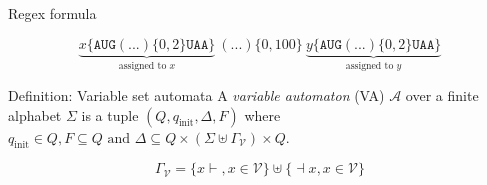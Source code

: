 \documentclass{beamer}
\begin{document}
  \begin{frame}{Regex formula}
    \begin{center}
      \[
        \underbrace{x\{\texttt{AUG}(...)\{0,2\} \texttt{UAA}\}}_{\text{assigned
        to $x$}}
        \ (...)\{0,100\}
        \ \underbrace{y\{\texttt{AUG}(...)\{0,2\}
        \texttt{UAA}\}}_{\text{assigned to $y$}}
      \]
    \end{center}


    \begin{block}{Definition: Variable set automata}
      A \emph{variable automaton} (VA) $\mathcal{A}$ over a finite alphabet
      $\Sigma$ is a tuple $(Q, q_\text{init}, \Delta, F)$ where $q_\text{init}
      \in Q, F \subseteq Q \text{ and } \Delta \subseteq Q \times (\Sigma \uplus
      \Gamma_\mathcal{V}) \times Q$.

      $$\Gamma_\mathcal{V} = \{x{\vdash}, x \in \mathcal{V}\} \uplus
      \{{\dashv}x, x \in \mathcal{V}\}$$
    \end{block}

    \begin{figure}[ht]%
      \centering
\end{figure}
\end{frame}
\end{document}
